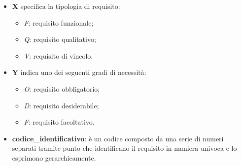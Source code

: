                 \begin{itemize}
                    \item \textbf{X} specifica la tipologia di requisito:
                        \begin{itemize}
                            \item \textit{F}: requisito funzionale;
                            \item \textit{Q}: requisito qualitativo;
                            \item \textit{V}: requisito di vincolo.
                        \end{itemize}
                    \item \textbf{Y} indica uno dei seguenti gradi di necessità:
                        \begin{itemize}
                            \item \textit{O}: requisito obbligatorio;
                            \item \textit{D}: requisito desiderabile;
                            \item \textit{F}: requisito facoltativo.
                        \end{itemize}
                    \item \textbf{codice\_identificativo}: è un codice composto da una serie di numeri separati tramite
                    punto che identificano il requisito in maniera univoca e lo esprimono gerarchicamente.
                \end{itemize}
          
